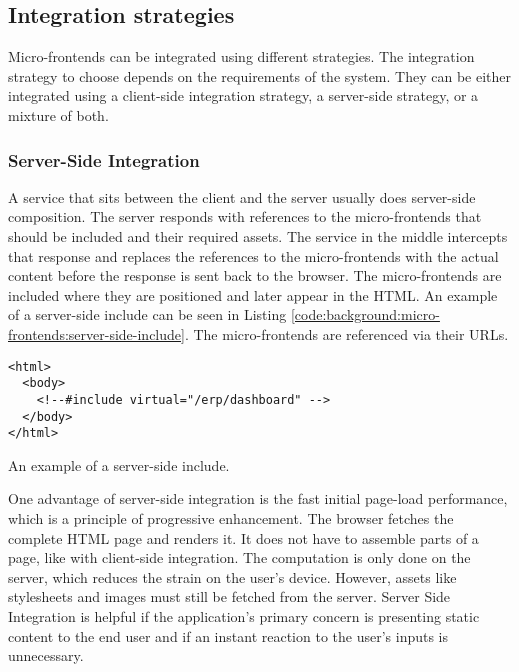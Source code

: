 \subsection{Integration strategies}\label{subsection:background:micro-frontend-architecture:integration-strategies}

Micro-frontends can be integrated using different strategies. The integration strategy to choose depends on the requirements of the system. They can be either integrated using a client-side integration strategy, a server-side strategy, or a mixture of both.

\subsubsection{Server-Side Integration}\label{subsubsection:background:micro-frontend-architecture:integration-strategies:server-side-integration}

A service that sits between the client and the server usually does server-side composition. \cite[60]{book:2020:geers:background:micro-frontends:micro-frontends-in-action} The server responds with references to the micro-frontends that should be included and their required assets. The service in the middle intercepts that response and replaces the references to the micro-frontends with the actual content before the response is sent back to the browser. The micro-frontends are included where they are positioned and later appear in the \ac{HTML}. An example of a server-side include can be seen in Listing \ref{code:background:micro-frontends:server-side-include}. The micro-frontends are referenced via their \acp{URL}. \cite[61-63]{book:2020:geers:background:micro-frontends:micro-frontends-in-action}

\ifshowListings
\begin{listing}[H]
  \begin{verbatim}
<html>
  <body>
    <!--#include virtual="/erp/dashboard" -->
  </body>
</html>
  \end{verbatim}
  \caption{An example of a server-side include.}\label{code:background:micro-frontends:server-side-include}
\end{listing}
\fi

\bigskip

\noindent One advantage of server-side integration is the fast initial page-load performance, which is a principle of progressive enhancement. \cite{book:2010:parker:background:micro-frontends:designing-with-progressive-enhancement} The browser fetches the complete \ac{HTML} page and renders it. It does not have to assemble parts of a page, like with client-side integration. The computation is only done on the server, which reduces the strain on the user's device. \cite{book:2020:geers:background:micro-frontends:micro-frontends-in-action} However, assets like stylesheets and images must still be fetched from the server. Server Side Integration is helpful if the application's primary concern is presenting static content to the end user and if an instant reaction to the user's inputs is unnecessary.  \cite[83]{book:2020:geers:background:micro-frontends:micro-frontends-in-action}

